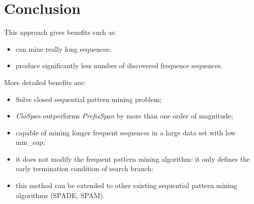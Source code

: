 \documentclass[journal]{IEEEtran}
\begin{document}
\section{Conclusion}
This approach gives benefits such as:
\begin{itemize}
  \item can mine really long sequences;
  \item produce significantly less number of discovered frequence sequences.
\end{itemize}

More detailed benefits are:
\begin{itemize}
\item Solve closed sequential pattern mining problem;
\item {\it CloSpan} outperforms {\it PrefixSpan} by more than one order of magnitude;
\item capable of mining longer frequent sequences in a large data set with low min\_sup;
\item it does not modify the frequent pattern mining algorithm: it only defines the early termination condition of search branch;
\item this method can be extended to other existing sequential pattern mining algorithms (SPADE, SPAM).
\end{itemize}



\end{document}
